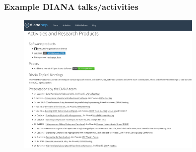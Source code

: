 \begin{frame}
\frametitle{Example DIANA talks/activities}

\begin{figure}[htbp]
\begin{center}
\includegraphics[width=0.8\textwidth]{images/20161213-diana-activities.png}
\end{center}
\end{figure}


\end{frame}


